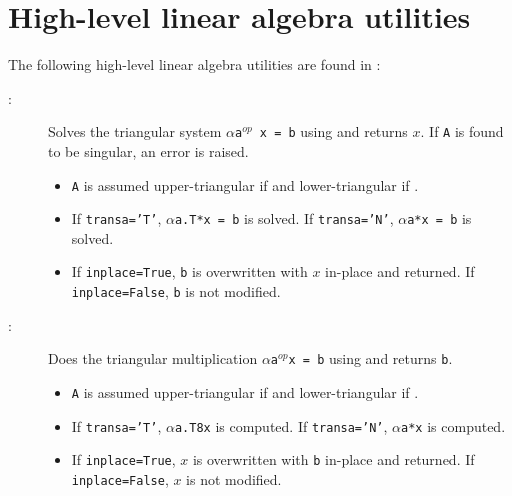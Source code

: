 \documentclass[]{manual}
\begin{document}
\section{High-level linear algebra utilities}
The following high-level linear algebra utilities are found in :
\begin{description}

    \item[:] Solves the triangular system \texttt{$\alpha$a$^{op}$ x = b} using  and returns $x$. If \texttt{A} is found to be singular, an error is raised. 
    \begin{itemize}
        \item \texttt{A} is assumed upper-triangular if  and lower-triangular if .
        \item If \texttt{transa='T'}, \texttt{$\alpha$a.T*x = b} is solved. If \texttt{transa='N'}, \texttt{$\alpha$a*x = b} is solved.
        \item If \texttt{inplace=True}, \texttt{b} is overwritten with $x$ in-place and returned. If \texttt{inplace=False}, \texttt{b} is not modified.
    \end{itemize}

    \item[:] Does the triangular multiplication \texttt{$\alpha$a$^{op}$x = b} using  and returns \texttt{b}.
    \begin{itemize}
        \item \texttt{A} is assumed upper-triangular if  and lower-triangular if .
        \item If \texttt{transa='T'}, \texttt{$\alpha$a.T8x} is computed. If \texttt{transa='N'}, \texttt{$\alpha$a*x} is computed.
        \item If \texttt{inplace=True}, $x$ is overwritten with \texttt{b} in-place and returned. If \texttt{inplace=False}, $x$ is not modified.
    \end{itemize}    
\end{description}
        
    
\end{document}
